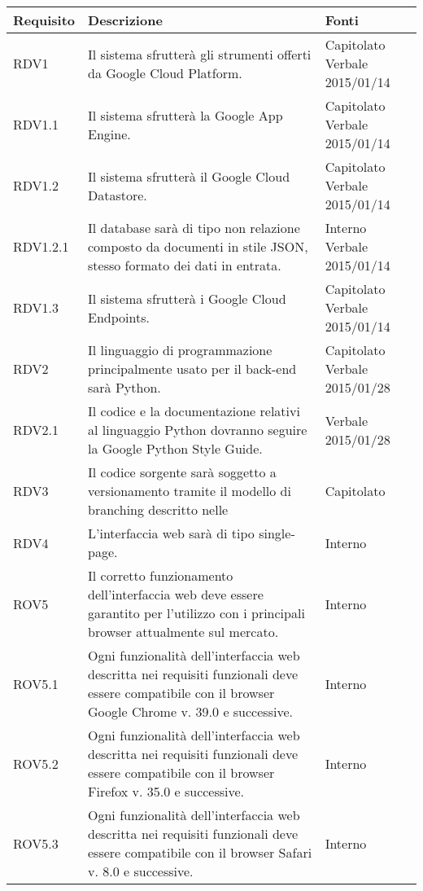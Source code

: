 \begin{center}

	\def\arraystretch{1.5}
	\bgroup
	\begin{longtable}{| p{2.5cm} | p{8cm} | p{2cm} |}

		\hline
		\textbf{Requisito} & \textbf{Descrizione} & \textbf{Fonti} \\
		\hline

		RDV1  &  Il sistema sfrutterà gli strumenti offerti da Google Cloud Platform.  &  Capitolato \newline Verbale 2015/01/14 \\
		\hline
		RDV1.1  &  Il sistema sfrutterà la Google App Engine.  &  Capitolato \newline Verbale 2015/01/14 \\
		\hline
		RDV1.2  &  Il sistema sfrutterà il Google Cloud Datastore.  &  Capitolato \newline Verbale 2015/01/14 \\
		\hline
		RDV1.2.1  &  Il database sarà di tipo non relazione composto da documenti in stile JSON, stesso formato dei dati in entrata.  &  Interno \newline Verbale 2015/01/14 \\
		\hline
		RDV1.3  &  Il sistema sfrutterà i Google Cloud Endpoints.  &  Capitolato \newline Verbale 2015/01/14 \\
		\hline

		RDV2  &  Il linguaggio di programmazione principalmente usato per il back-end sarà Python.  &  Capitolato \newline Verbale 2015/01/28 \\
		\hline
		RDV2.1 & Il codice e la documentazione relativi al linguaggio Python dovranno seguire la Google Python Style Guide. & Verbale 2015/01/28 \\
		\hline

		RDV3  &  Il codice sorgente sarà soggetto a versionamento tramite il modello di branching descritto nelle \docNameVersionNdP  &  Capitolato \\
		\hline
		RDV4  &  L'interfaccia web sarà di tipo single-page.  &  Interno \\
		\hline

		ROV5  &  Il corretto funzionamento dell'interfaccia web deve essere garantito per l'utilizzo con i principali browser attualmente sul mercato.   &  Interno \\
		\hline
		ROV5.1  &  Ogni funzionalità dell'interfaccia web descritta nei requisiti funzionali deve essere compatibile con il browser Google Chrome v. 39.0 e successive.   &  Interno \\
		\hline
		ROV5.2  &  Ogni funzionalità dell'interfaccia web descritta nei requisiti funzionali deve essere compatibile con il browser Firefox v. 35.0 e successive.   &  Interno \\
		\hline
		ROV5.3  &  Ogni funzionalità dell'interfaccia web descritta nei requisiti funzionali deve essere compatibile con il browser Safari v. 8.0 e successive.   &  Interno \\
		\hline


\end{longtable}
\end{center}
